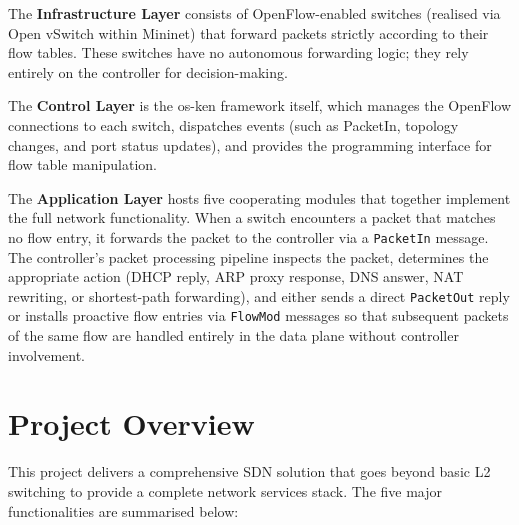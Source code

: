 \documentclass[12pt,a4paper]{article}
\begin{document}
The \textbf{Infrastructure Layer} consists of OpenFlow-enabled switches (realised via Open vSwitch within Mininet) that forward packets strictly according to their flow tables. These switches have no autonomous forwarding logic; they rely entirely on the controller for decision-making.

The \textbf{Control Layer} is the os-ken framework itself, which manages the OpenFlow connections to each switch, dispatches events (such as PacketIn, topology changes, and port status updates), and provides the programming interface for flow table manipulation.

The \textbf{Application Layer} hosts five cooperating modules that together implement the full network functionality. When a switch encounters a packet that matches no flow entry, it forwards the packet to the controller via a \texttt{PacketIn} message. The controller's packet processing pipeline inspects the packet, determines the appropriate action (DHCP reply, ARP proxy response, DNS answer, NAT rewriting, or shortest-path forwarding), and either sends a direct \texttt{PacketOut} reply or installs proactive flow entries via \texttt{FlowMod} messages so that subsequent packets of the same flow are handled entirely in the data plane without controller involvement.

\section{Project Overview}

This project delivers a comprehensive SDN solution that goes beyond basic L2 switching to provide a complete network services stack. The five major functionalities are summarised below:
\end{document}
